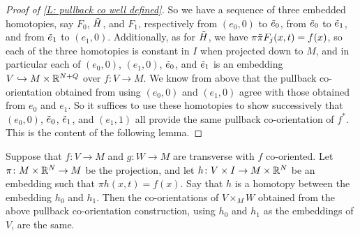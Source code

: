 \begin{proof}[Proof of \cref{L: pullback co well defined}]
	So we have a sequence of three embedded homotopies, say $F_0$, $\tilde H$, and $F_1$, respectively from $(e_0,0)$ to $\tilde e_0$, from $\tilde e_0$ to $\tilde e_1$, and from $\tilde e_1$ to $(e_1,0)$.
	Additionally, as for $\tilde H$, we have $\pi \tilde \pi F_j(x,t) = f(x)$, so each of the three homotopies is constant in $I$ when projected down to $M$, and in particular each of $(e_0,0)$, $(e_1,0)$, $\tilde e_0$, and $\tilde e_1$ is an embedding $V \hookrightarrow M \times \mathbb{R}^{N+Q}$ over $f \colon V \to M$.
	We know from above that the pullback co-orientation obtained from using $(e_0,0)$ and $(e_1,0)$ agree with those obtained from $e_0$ and $e_1$.
	So it suffices to use these homotopies to show successively that $(e_0,0)$, $\tilde e_0$, $\tilde e_1$, and $(e_1,1)$ all provide the same pullback co-orientation of $f^*$. This is the content of the following lemma.
\end{proof}

\begin{lemma}\label{L: homotopy pullback independence}
	Suppose that $f \colon V \to M$ and $g \colon W \to M$ are transverse with $f$ co-oriented.
	Let $\pi \colon M \times \mathbb{R}^N \to M$ be the projection, and let $h \colon V \times I \to M \times \mathbb{R}^N$ be an embedding such that $\pi h(x,t) = f(x)$.
	Say that $h$ is a homotopy between the embedding $h_0$ and $h_1$.
	Then the co-orientations of $V \times_M W$ obtained from the above pullback co-orientation construction, using $h_0$ and $h_1$ as the embeddings of $V$, are the same.
\end{lemma}

